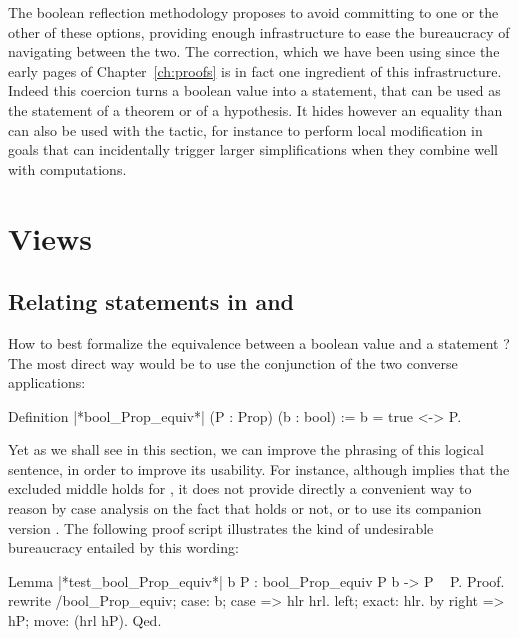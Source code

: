 The boolean reflection methodology proposes to avoid
committing to one or the other of these options, providing enough
infrastructure to ease the bureaucracy of navigating between the two.
The  correction, which we have been using since the early
pages of Chapter~\ref{ch:proofs} is in fact one ingredient of this
infrastructure. Indeed
this coercion turns a boolean value into a  statement, that
can be used as the statement of a theorem or of a hypothesis. It
hides however an equality than can also be used with the 
tactic, for instance to perform local modification in goals that can
incidentally trigger larger simplifications when they combine well with
computations. 


\section{Views}

\subsection{Relating statements in  and }\label{ssec:boolProp}

How to best formalize the equivalence between a boolean value 
and a statement ? The most direct way would be to use the
conjunction of the two converse applications:

\begin{coq}{}{}
Definition |*bool_Prop_equiv*| (P : Prop) (b : bool) := b = true <-> P.
\end{coq}
Yet as we shall see in this section, we can improve the phrasing of
this logical sentence, in order to improve its usability. For
instance, although  implies that the excluded
middle holds for , it does not provide directly a convenient way
to reason by case analysis on the fact that  holds or not, or to
use its companion version . The following proof
script illustrates the kind of undesirable bureaucracy entailed by
this wording:

\begin{coq}{}{}
Lemma |*test_bool_Prop_equiv*| b P : bool_Prop_equiv P b -> P \/ ~ P.
Proof.
rewrite /bool_Prop_equiv; case: b; case => hlr hrl.
  left; exact: hlr.
by right => hP; move: (hrl hP).
Qed.
\end{coq}

